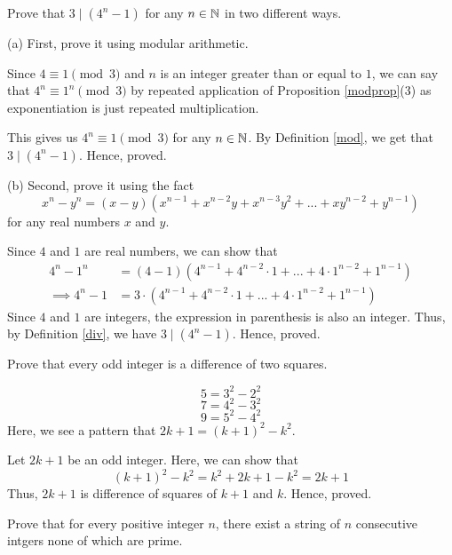 \begin{problem} 
	Prove that $3 \mid (4^n - 1)$ for any $n \in \mathbb{N}$ in two different ways.

	(a) First, prove it using modular arithmetic.
	\begin{solution}
		Since $4 \equiv 1 \pmod{3}$ and $n$ is an integer greater than or equal to $1$, we can say that $4^n \equiv 1^n \pmod{3}$ by repeated application of Proposition \ref{modprop}(3) as exponentiation is just repeated multiplication.

		This gives us $4^n \equiv 1 \pmod{3}$ for any $n \in \mathbb{N}$.
		By Definition \ref{mod}, we get that $3 \mid (4^n-1)$.
		Hence, proved.
	\end{solution}
	
	(b) Second, prove it using the fact
	$$x^n - y^n = (x-y)(x^{n-1} + x^{n-2}y + x^{n-3}y^2+ ... + xy^{n-2} + y^{n-1})$$ 
	for any real numbers $x$ and $y$.
	\begin{solution}
		Since $4$ and $1$ are real numbers, we can show that 
		\begin{align}
			4^n - 1^n &= (4-1)(4^{n-1} + 4^{n-2} \cdot 1 + ... + 4 \cdot 1^{n-2} + 1^{n-1}) \\
			\implies 4^n - 1 &= 3 \cdot (4^{n-1} + 4^{n-2} \cdot 1 + ... + 4 \cdot 1^{n-2} + 1^{n-1})
		\end{align}
		Since $4$ and $1$ are integers, the expression in parenthesis is also an integer. Thus, by Definition \ref{div}, we have $3 \mid (4^n - 1)$. Hence, proved.
	\end{solution}
\end{problem}


\begin{problem}
	Prove that every odd integer is a difference of two squares.
\end{problem}

\begin{scratch}
	$$5 = 3^2 - 2^2$$
	$$7 = 4^2 - 3^2$$
	$$9 = 5^2 - 4^2$$
	Here, we see a pattern that $2k+1 = (k+1)^2 - k^2$.
\end{scratch}

\begin{solution}
	Let $2k+1$ be an odd integer. Here, we can show that
	$$(k+1)^2 - k^2 = k^2 + 2k + 1 - k^2 = 2k + 1$$
	Thus, $2k+1$ is difference of squares of $k+1$ and $k$.
	Hence, proved.
\end{solution}


\begin{problem}
	Prove that for every positive integer $n$, there exist a string of $n$ consecutive intgers none of which are prime.
\end{problem}

